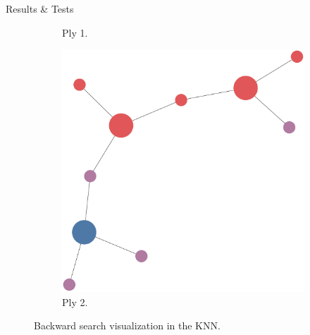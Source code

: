 \documentclass[final]{beamer} %
\begin{document}
\begin{frame}
\begin{columns}
\begin{column}{.33\textwidth}
{\begin{block}{Results \& Tests}
\begin{figure}[!htb]
\begin{subfigure}[!htb]{0.32\columnwidth}
							\caption{Ply 1.}
						\end{subfigure}
						\begin{subfigure}[!htb]{0.32\columnwidth}
							\centering
							\includegraphics[width=\columnwidth]{figures/knn_simple_backward_think_2.pdf}
							\caption{Ply 2.}
						\end{subfigure}
						\caption{Backward search visualization in the KNN.}
						\label{fig:backward_search_test}
					\end{figure}
				

\end{block}}
\end{column}
\end{columns}
\end{frame}
\end{document}
